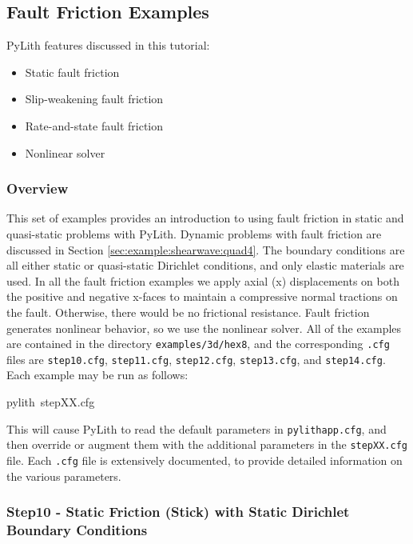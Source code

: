 
\subsection{\label{sec:Tutorial-3d-hex8-friction}Fault Friction Examples}

PyLith features discussed in this tutorial:
\begin{itemize}
\item Static fault friction
\item Slip-weakening fault friction
\item Rate-and-state fault friction
\item Nonlinear solver
\end{itemize}

\subsubsection{Overview}

This set of examples provides an introduction to using fault friction
in static and quasi-static problems with PyLith. Dynamic problems
with fault friction are discussed in Section \vref{sec:example:shearwave:quad4}.
The boundary conditions are all either static or quasi-static Dirichlet
conditions, and only elastic materials are used. In all the fault
friction examples we apply axial (x) displacements on both the positive
and negative x-faces to maintain a compressive normal tractions on
the fault. Otherwise, there would be no frictional resistance. Fault
friction generates nonlinear behavior, so we use the nonlinear solver.
All of the examples are contained in the directory \texttt{examples/3d/hex8},
and the corresponding \texttt{.cfg} files are \texttt{step10.cfg},
\texttt{step11.cfg}, \texttt{step12.cfg}, \texttt{step13.cfg}, and
\texttt{step14.cfg}. Each example may be run as follows:
\begin{lyxcode}
pylith~stepXX.cfg
\end{lyxcode}
This will cause PyLith to read the default parameters in \texttt{pylithapp.cfg},
and then override or augment them with the additional parameters in
the \texttt{stepXX.cfg} file. Each \texttt{.cfg} file is extensively
documented, to provide detailed information on the various parameters.


\subsubsection{Step10 - Static Friction (Stick) with Static Dirichlet Boundary Conditions}

